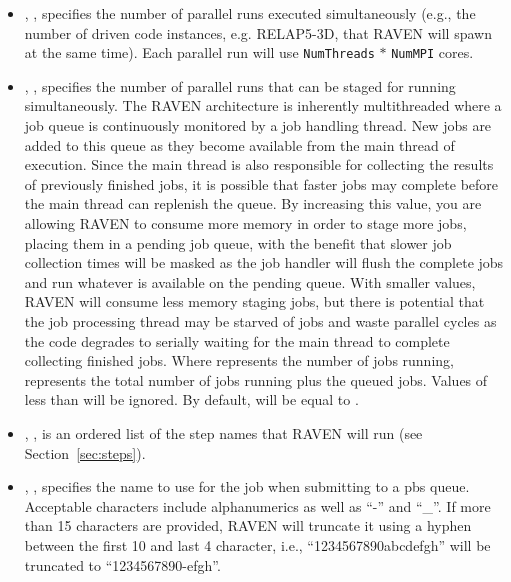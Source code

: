 \begin{itemize}
\item {}, ,
  specifies the number of parallel runs executed simultaneously (e.g.,
  the number of driven code instances, e.g. RELAP5-3D, that RAVEN will
  spawn at the same time).  Each parallel run will use
  \texttt{NumThreads} $*$ \texttt{NumMPI} cores.
%

\item {}, ,
  specifies the number of parallel runs that can be staged for running
  simultaneously.
  The RAVEN architecture is inherently multithreaded where a job queue is
  continuously monitored by a job handling thread.
  New jobs are added to this queue as they become available from the main thread
  of execution.
  Since the main thread is also responsible for collecting the results of
  previously finished jobs, it is possible that faster jobs may complete before
  the main thread can replenish the queue.
  By increasing this value, you are allowing RAVEN to consume more memory 
  in order to stage more jobs, placing them in a pending job queue, with the
  benefit that slower job collection times will be masked as the job handler
  will flush the complete jobs and run whatever is available on the pending
  queue.
  With smaller values, RAVEN will consume less memory staging jobs, but there is
  potential that the job processing thread may be starved of jobs and waste
  parallel cycles as the code degrades to serially waiting for the main thread
  to complete collecting finished jobs.
  Where  represents the number of jobs running,
   represents the total number of jobs running plus the
  queued jobs. Values of  less than 
  will be ignored. By default,  will be equal to
  .

\item {}, , is
an ordered list of the step names that RAVEN will run (see
Section~\ref{sec:steps}).

\item {}, , specifies
the name to use for the job when submitting to a pbs queue.  Acceptable characters
include alphanumerics as well as ``-'' and ``\_''.  If more than 15
characters are provided, RAVEN will truncate it using a hyphen between the first
10 and last 4 character, i.e., ``1234567890abcdefgh'' will be truncated to
``1234567890-efgh''.
%


\end{itemize}
